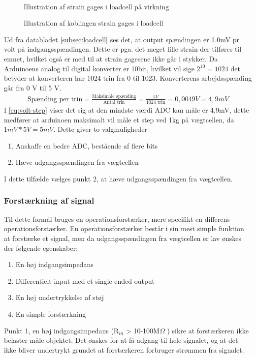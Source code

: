 \begin{figure}[htbp]
\begin{minipage}[b]{0.48\textwidth}
\end{minipage} \\ %
\begin{minipage}[t]{0.48\textwidth}
\caption{Illustration af strain gages i loadcell på virkning} %
\label{fig:Loadcell1}
\end{minipage} \hfill
\begin{minipage}[t]{0.48\textwidth}
\caption{Illustration af koblingen strain gages i loadcell} %
\label{fig:loadcell2}
\end{minipage}
\end{figure}

Ud fra databladet \ref{subsec:loadcell} ses det, at output spændingen er 1.0mV pr volt på indgangsspændingen. Dette er pga. det meget lille strain der tilføres til emnet, hvilket også er med til at strain gagesene ikke går i stykker. Da Arduinoens analog til digital konverter er 10bit, hvilket vil sige $2^{10}=1024$ det betyder at konverteren har 1024 trin fra 0 til 1023. Konverterens arbejdsspænding går fra 0 V til 5 V. 
\begin{align}
 \text{Spænding per trin}=\frac{\text{Maksimale spænding}}{\text{Antal trin}}=\frac{5 V}{1024\text{ trin}}=0,0049V=4,9mV
 \label{eq:volt-step}
 \end{align}
I \ref{eq:volt-step} viser det sig at den mindste værdi ADC kan måle er 4,9mV, dette medfører at arduinoen maksimalt vil måle et step ved 1kg på vægtcellen, da $1mV*5V=5mV$. Dette giver to valgmuligheder
\begin{enumerate}
\item Anskaffe en bedre ADC, bestående af flere bits
\item Hæve udgangsspændingen fra vægtcellen 
\end{enumerate}
I dette tilfælde vælges punkt 2, at hæve udgangsspændingen fra vægtcellen. 
\subsubsection*{Forstærkning af signal}
Til dette formål bruges en operationsforstærker, mere specifikt en differens operationsforstærker. En operationsforstærker består i sin mest simple funktion at forstærke et signal, men da udgangsspændingen fra vægtcellen er lav ønskes der følgende egenskaber:
\begin{enumerate}
\item En høj indgangsimpedans 
\item Differentielt input med et single ended output
\item En høj undertrykkelse af støj
\item En simple forstærkning
\end{enumerate}
Punkt 1, en høj indgangsimpedans (R$_{in}$ > 10-100M$\Omega$ ) sikre at forstærkeren ikke belaster måle objektet. Det ønskes for at få adgang til hele signalet, og at det ikke bliver undertrykt grundet at forstærkeren forbruger strømmen fra signalet.

